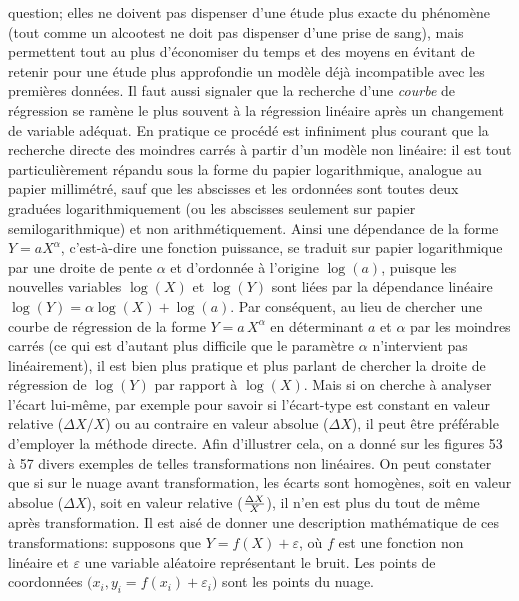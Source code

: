 question; elles ne doivent pas dispenser d'une \'etude plus exacte du 
ph\'enom\`ene (tout comme un alcootest ne doit pas dispenser d'une 
prise de sang), mais permettent tout au plus d'\'economiser du temps 
et des moyens en \'evitant de retenir pour une \'etude plus approfondie 
un mod\`ele d\'ej\`a incompatible avec les premi\`eres donn\'ees. 
\medskip 
Il faut aussi signaler que la recherche d'une {\it courbe} de
r\'egression se ram\`ene le plus souvent \`a la r\'egression lin\'eaire 
apr\`es un changement de variable ad\'equat. En pratique ce proc\'ed\'e 
est infiniment plus courant que la recherche directe des moindres 
carr\'es \`a partir d'un mod\`ele non lin\'eaire: il est tout 
particuli\`erement r\'epandu sous la forme du papier logarithmique, 
analogue au papier millim\'etr\'e, sauf que les abscisses et les
ordonn\'ees sont toutes deux gradu\'ees logarithmiquement (ou les
abscisses seulement sur papier semilogarithmique) et non
arithm\'etiquement. Ainsi une d\'ependance de la forme $Y = 
aX^\alpha$, c'est-\`a-dire une fonction puissance, se traduit sur
papier logarithmique par une droite de pente $\alpha$ et d'ordonn\'ee 
\`a l'origine $\log (a)$, puisque les nouvelles variables $\log (X)$ et 
$\log (Y)$ sont li\'ees par la d\'ependance lin\'eaire $\log (Y) = \alpha 
\log (X) + \log (a)$. Par cons\'equent, au lieu de chercher une courbe
de r\'egression de la forme $Y = a\, X^\alpha$ en d\'eterminant $a$ et 
$\alpha$ par les moindres carr\'es (ce qui est d'autant plus difficile 
que le param\`etre $\alpha$ n'intervient pas lin\'eairement), il est bien 
plus pratique et plus parlant de chercher la droite de r\'egression de 
$\log (Y)$ par rapport \`a $\log (X)$. Mais si on cherche \`a analyser 
l'\'ecart lui-m\^eme, par exemple pour savoir si l'\'ecart-type est 
constant en valeur relative ($\Delta X / X$) ou au contraire en valeur 
absolue ($\Delta X$), il peut \^etre pr\'ef\'erable d'employer la 
m\'ethode directe. 
\medskip 
Afin d'illustrer cela, on a donn\'e sur les figures 53 \`a 57 divers 
exemples de telles transformations non lin\'eaires. On peut constater
que si sur le nuage avant transformation, les \'ecarts sont homog\`enes, 
soit en valeur absolue ($\Delta X$), soit en valeur relative (${\Delta X 
\over X}$), il n'en est plus du tout de m\^eme apr\`es transformation. 
Il est ais\'e de donner une description math\'ematique de ces 
transformations: supposons que $Y = f(X) + \varepsilon$, o\`u $f$ est
une fonction non lin\'eaire et $\varepsilon$ une variable al\'eatoire 
repr\'esentant le bruit. Les points de coordonn\'ees $\big(x_i, 
y_i=f(x_i) + \varepsilon_i\big)$ sont les points du nuage. 
\medskip 

